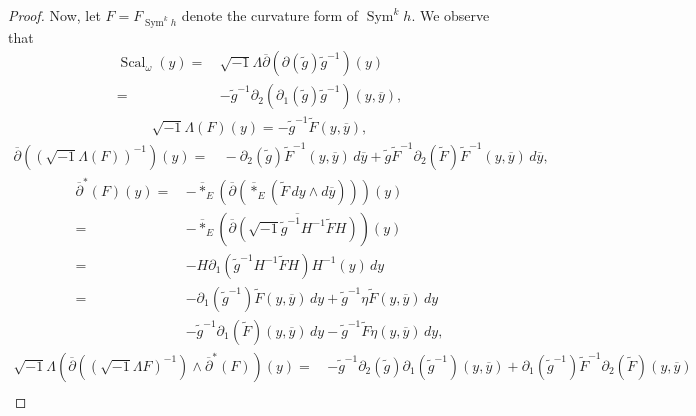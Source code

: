\documentclass{amsart}
\theoremstyle{definition}
\theoremstyle{remark}
\numberwithin{equation}{section}
\DeclareMathOperator{\Sym}{Sym}
\DeclareMathOperator{\Scal}{Scal}
\begin{document}
\begin{proof}
Now, let $F = F_{\Sym^k h}$ denote the curvature form of $\Sym^k h$. We observe that
\begin{align*}
\Scal_\omega (y) =  \hspace{2pt} & \sqrt{-1} \Lambda \overline{\partial} \left ( \partial (\tilde{g}) \tilde{g}^{-1} \right )(y) \\
    = \hspace{2pt} & -\tilde{g}^{-1} \partial_2 (  \partial_1 (\tilde{g}) \tilde{g}^{-1} ) (y,\overline{y}),
\end{align*}
\begin{align*}
\sqrt{-1} \Lambda (F)(y) =  -\tilde{g}^{-1} \tilde{F} (y,\overline{y}),
\end{align*}
\begin{align*}
\overline{\partial} \left ( \left ( \sqrt{-1}\Lambda (F) \right )^{-1} \right ) (y) 
    = & \hspace{2pt} - \partial_2 (\tilde{g}) \tilde{F}^{-1}(y,\overline{y}) \,d\overline{y} + \tilde{g} \tilde{F}^{-1} \partial_2 (\tilde{F}) \tilde{F}^{-1}(y,\overline{y}) \,d\overline{y}, 
\end{align*}
\begin{align*}
\overline{\partial}^* (F)(y) = \hspace{2pt} &  - \overline{*}_E (\overline{\partial}( \overline{*}_E (\tilde{F} \, dy \wedge d\overline{y}))) (y)\\
    = \hspace{2pt} &  -\overline{*}_E \left (\overline{\partial} \overline{\left ( \sqrt{-1} \tilde{g}^{-1} H^{-1} \tilde{F} H  \right ) }\right ) (y)\\
    = \hspace{2pt} & -H \partial_1 \left ( \tilde{g}^{-1} H^{-1} \tilde{F} H \right ) H^{-1} (y) \, dy \\
    = \hspace{2pt} & - \partial_1(\tilde{g}^{-1})\tilde{F}(y,\overline{y}) \,dy  + \tilde{g}^{-1} \eta\tilde{F}(y,\overline{y})\,dy \\
    & - \tilde{g}^{-1} \partial_1(\tilde{F}) (y,\overline{y}) \,dy - \tilde{g}^{-1}\tilde{F}\eta(y,\overline{y}) \,dy,
\end{align*}
\begin{align*}
\sqrt{-1} \Lambda  \left ( \overline{\partial}\left ( \left ( \sqrt{-1}\Lambda F \right )^{-1}\right )  \wedge \overline{\partial}^* (F) \right ) (y) = \hspace{2pt} 
    & -\tilde{g}^{-1} \partial_2(\tilde{g})\partial_1(\tilde{g}^{-1}) (y,\overline{y}) + \partial_1(\tilde{g}^{-1}) \tilde{F}^{-1} \partial_2 ( \tilde{F})  (y,\overline{y}) \\

\end{align*}
\end{proof}
\end{document}
